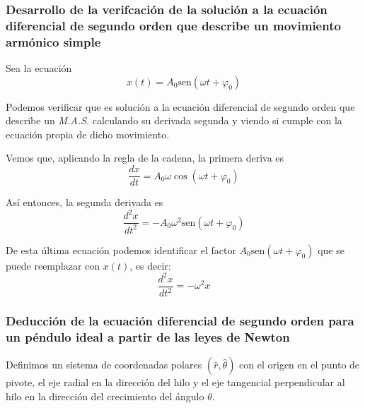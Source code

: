\subsubsection{Desarrollo de la verifcación de la solución a la ecuación diferencial de segundo orden que describe un movimiento armónico simple}
\label{subsubsec:verifiacion-solucion-edo-MAS}
Sea la ecuación 
\begin{equation}
   x(t) = A_0 \text{sen}(\omega t + \varphi_0) 
\end{equation}

Podemos verificar que es solución a la ecuación diferencial de segundo orden que describe un \textit{M.A.S.} calculando su derivada segunda y viendo si cumple con la ecuación propia de dicho movimiento. 

Vemos que, aplicando la regla de la cadena, la primera deriva es
\begin{equation}
    \frac{dx}{dt}= A_0\omega \cos(\omega t + \varphi_0)
\end{equation}
 
 Así entonces, la segunda derivada es
 \begin{equation}
     \frac{d^2x}{dt^2}= -A_0\omega^2 \text{sen}(\omega t + \varphi_0)
 \end{equation}
 
 De esta última ecuación podemos identificar el factor $A_0\text{sen}(\omega t+ \varphi_0)$ que se puede reemplazar con $x(t)$, es decir:
\begin{equation}
    \frac{d^2x}{dt^2}= -\omega^2x
\end{equation} 


\clearpage
\subsubsection{Deducción de la ecuación diferencial de segundo orden para un péndulo ideal a partir de las leyes de Newton}
\label{subsubsec:deduccion-edo-pendulo-ideal}

Definimos un sistema de coordenadas polares $(\hat{r}, \hat{\theta})$ con el origen en el punto de pivote, el eje radial en la dirección del hilo y el eje tangencial perpendicular al hilo en la dirección del crecimiento del ángulo $\theta$. 

